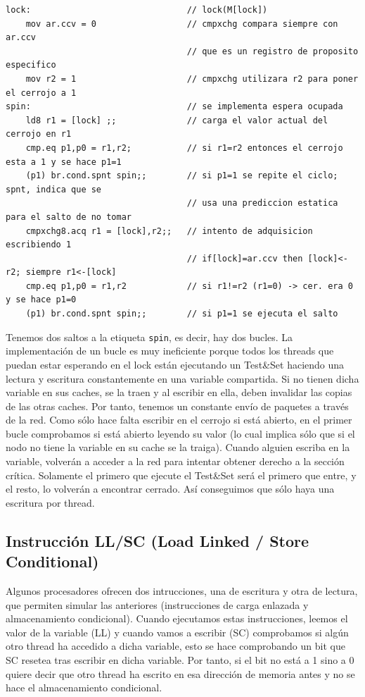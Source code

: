 \documentclass[10pt,a4paper,spanish]{report}
\begin{document}
\begin{verbatim}
lock:                               // lock(M[lock])
    mov ar.ccv = 0                  // cmpxchg compara siempre con ar.ccv
                                    // que es un registro de proposito especifico
    mov r2 = 1                      // cmpxchg utilizara r2 para poner el cerrojo a 1
spin:                               // se implementa espera ocupada
    ld8 r1 = [lock] ;;              // carga el valor actual del cerrojo en r1
    cmp.eq p1,p0 = r1,r2;           // si r1=r2 entonces el cerrojo esta a 1 y se hace p1=1
    (p1) br.cond.spnt spin;;        // si p1=1 se repite el ciclo; spnt, indica que se
                                    // usa una prediccion estatica para el salto de no tomar
    cmpxchg8.acq r1 = [lock],r2;;   // intento de adquisicion escribiendo 1
                                    // if[lock]=ar.ccv then [lock]<-r2; siempre r1<-[lock]
    cmp.eq p1,p0 = r1,r2            // si r1!=r2 (r1=0) -> cer. era 0 y se hace p1=0
    (p1) br.cond.spnt spin;;        // si p1=1 se ejecuta el salto
\end{verbatim}

Tenemos dos saltos a la etiqueta \verb*|spin|, es decir, hay dos bucles. La implementación de un bucle es muy ineficiente porque todos los threads que puedan estar esperando en el lock están ejecutando un Test\&Set haciendo una lectura y escritura constantemente en una variable compartida. Si no tienen dicha variable en sus caches, se la traen y al escribir en ella, deben invalidar las copias de las otras caches. Por tanto, tenemos un constante envío de paquetes a través de la red. Como sólo hace falta escribir en el cerrojo si está abierto, en el primer bucle comprobamos si está abierto leyendo su valor (lo cual implica sólo que si el nodo no tiene la variable en su cache se la traiga). Cuando alguien escriba en la variable, volverán a acceder a la red para intentar obtener derecho a la sección crítica. Solamente el primero que ejecute el Test\&Set será el primero que entre, y el resto, lo volverán a encontrar cerrado. Así conseguimos que sólo haya una escritura por thread.

\textcolor{azul}{\subsection{Instrucción LL/SC (Load Linked / Store Conditional)}}
Algunos procesadores ofrecen dos intrucciones, una de escritura y otra de lectura, que permiten simular las anteriores (instrucciones de carga enlazada y almacenamiento condicional). Cuando ejecutamos estas instrucciones, leemos el valor de la variable (LL) y cuando vamos a escribir (SC) comprobamos si algún otro thread ha accedido a dicha variable, esto se hace comprobando un bit que SC resetea tras escribir en dicha variable. Por tanto, si el bit no está a 1 sino a 0 quiere decir que otro thread ha escrito en esa dirección de memoria antes y no se hace el almacenamiento condicional. 
\end{document}
